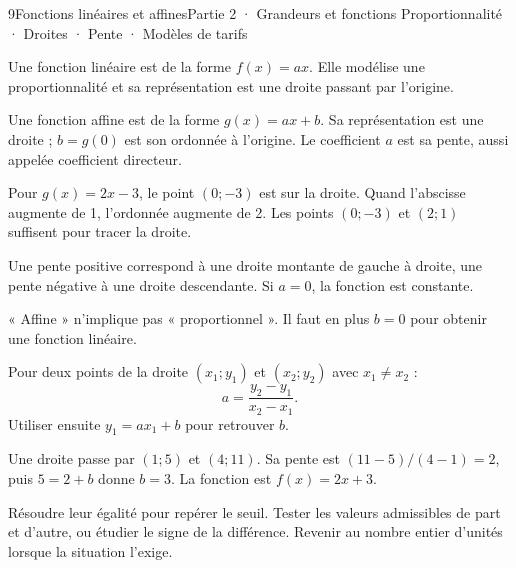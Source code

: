 \begin{ouverture}[courbe]{9}{Fonctions linéaires et affines}{Partie 2 · Grandeurs et fonctions}
{Proportionnalité · Droites · Pente · Modèles de tarifs}
\end{ouverture}
\pagestyle{otMain}\essentiel\fontsize{11}{15}\selectfont
{}
\begin{definition}Une fonction linéaire est de la forme $f(x)=ax$. Elle modélise une proportionnalité et sa représentation est une droite passant par l’origine.\end{definition}
\begin{definition}Une fonction affine est de la forme $g(x)=ax+b$. Sa représentation est une droite ; $b=g(0)$ est son ordonnée à l’origine. Le coefficient $a$ est sa pente, aussi appelée coefficient directeur.\end{definition}
\begin{exemple}Pour $g(x)=2x-3$, le point $(0;-3)$ est sur la droite. Quand l’abscisse augmente de 1, l’ordonnée augmente de 2. Les points $(0;-3)$ et $(2;1)$ suffisent pour tracer la droite.\end{exemple}
\begin{propriete}Une pente positive correspond à une droite montante de gauche à droite, une pente négative à une droite descendante. Si $a=0$, la fonction est constante.\end{propriete}
\begin{attention}« Affine » n’implique pas « proportionnel ». Il faut en plus $b=0$ pour obtenir une fonction linéaire.\end{attention}
\clearpage
{}
\begin{savoirfaire}Pour deux points de la droite $(x_1;y_1)$ et $(x_2;y_2)$ avec $x_1\ne x_2$ :
\[a=\frac{y_2-y_1}{x_2-x_1}.\]
Utiliser ensuite $y_1=ax_1+b$ pour retrouver $b$.\end{savoirfaire}
\begin{exemple}Une droite passe par $(1;5)$ et $(4;11)$. Sa pente est $(11-5)/(4-1)=2$, puis $5=2+b$ donne $b=3$. La fonction est $f(x)=2x+3$.\end{exemple}
\begin{savoirfaire}Résoudre leur égalité pour repérer le seuil. Tester les valeurs admissibles de part et d’autre, ou étudier le signe de la différence. Revenir au nombre entier d’unités lorsque la situation l’exige.\end{savoirfaire}
